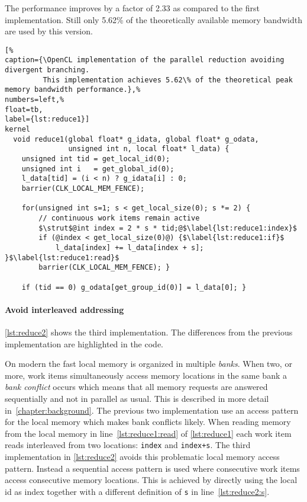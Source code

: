 The performance improves by a factor of 2.33 as compared to the first implementation.
Still only 5.62\% of the theoretically available memory bandwidth are used by this version.

\begin{lstlisting}[%                                                             
caption={\OpenCL implementation of the parallel reduction avoiding divergent branching.
         This implementation achieves 5.62\% of the theoretical peak memory bandwidth performance.},%
numbers=left,%
float=tb,
label={lst:reduce1}]
kernel
  void reduce1(global float* g_idata, global float* g_odata,
               unsigned int n, local float* l_data) {
    unsigned int tid = get_local_id(0);
    unsigned int i   = get_global_id(0);
    l_data[tid] = (i < n) ? g_idata[i] : 0;
    barrier(CLK_LOCAL_MEM_FENCE);

    for(unsigned int s=1; s < get_local_size(0); s *= 2) {
        // continuous work items remain active
        $\strut$@int index = 2 * s * tid;@$\label{lst:reduce1:index}$
        if (@index < get_local_size(0)@) {$\label{lst:reduce1:if}$
            l_data[index] += l_data[index + s]; }$\label{lst:reduce1:read}$
        barrier(CLK_LOCAL_MEM_FENCE); }

    if (tid == 0) g_odata[get_group_id(0)] = l_data[0]; }
\end{lstlisting}


\paragraph{Avoid interleaved addressing}

\autoref{lst:reduce2} shows the third implementation.
The differences from the previous implementation are highlighted in the code.

On modern \GPUs the fast local memory is organized in multiple \emph{banks}.
When two, or more, work items simultaneously access memory locations in the same bank a \emph{bank conflict} occurs which means that all memory requests are answered sequentially and not in parallel as usual.
This is described in more detail in~\autoref{chapter:background}.
The previous two implementation use an access pattern for the local memory which makes bank conflicts likely.
When reading memory from the local memory in line~\ref{lst:reduce1:read} of \autoref{lst:reduce1} each work item reads interleaved from two locations: \lstinline!index! and \lstinline!index+s!.
The third implementation in \autoref{lst:reduce2} avoids this problematic local memory access pattern.
Instead a sequential access pattern is used where consecutive work items access consecutive memory locations.
This is achieved by directly using the local id as index together with a different definition of \lstinline!s! in line~\ref{lst:reduce2:s}.

